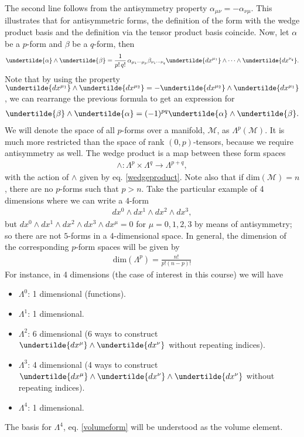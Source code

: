 \documentclass[10pt]{article}
\begin{document}
	The second line follows from the antisymmetry property $\alpha_{\mu\nu}=-\alpha_{\nu\mu}$. This illustrates that for antisymmetric forms, the definition of the form with the wedge product basis and the definition via the tensor product basis coincide. Now, let $\alpha$ be a $p$-form and $\beta$ be a $q$-form, then
	\begin{align}
	\label{wedgeproduct}
	\undertilde{\alpha}\wedge\undertilde{\beta}=\frac{1}{p!\, q!}\, \alpha_{\mu_1\cdots\mu_p}\beta_{\nu_1\cdots\nu_q}\undertilde{dx^{\mu_1}}\wedge \cdots \wedge \undertilde{dx^{\nu_q}}.
	\end{align}
	Note that by using the property $\undertilde{dx^{\mu_1}}\wedge \undertilde{dx^{\mu_2}}=-\undertilde{dx^{\mu_2}}\wedge \undertilde{dx^{\mu_1}}$, we can rearrange the previous formula to get an expression for 
	\begin{align}
	\undertilde{\beta}\wedge\undertilde{\alpha}=(-1)^{pq}\undertilde{\alpha}\wedge\undertilde{\beta}.
	\end{align}
	We will denote the space of all $p$-forms over a manifold, $\mathcal{M}$, as $\Lambda^p(\mathcal{M})$. It is much more restricted than the space of rank $(0,p)$-tensors, because we require antisymmetry as well. The wedge product is a map between these form spaces
	\begin{align}
	\wedge: \Lambda^p \times \Lambda^q \longrightarrow \Lambda^{p+q},
	\end{align} 
	with the action of $\wedge$ given by eq. \eqref{wedgeproduct}. Note also that if dim$(\mathcal{M})=n$, there are no $p$-forms such that $p>n$. Take the particular example of 4 dimensions where we can write a $4$-form
	\begin{align}
	\label{volumeform}
	dx^0\wedge dx^1 \wedge dx^2 \wedge dx^3,
	\end{align}
	but $dx^0\wedge dx^1 \wedge dx^2 \wedge dx^3\wedge dx^{\mu}=0$ for $\mu=0,1,2,3$ by means of antisymmetry; so there are not $5$-forms in a 4-dimensional space. In general, the dimension of the corresponding $p$-form spaces will be given by
	\begin{align}
	\text{dim}(\Lambda^p)=\frac{n!}{p!(n-p)!}
	\end{align}
	For instance, in 4 dimensions (the case of interest in this course) we will have
	\begin{itemize}
	\item $\Lambda^0$: 1 dimensional (functions).
	\item $\Lambda^1$: 1 dimensional. 
	\item $\Lambda^2$: 6 dimensional (6 ways to construct $\undertilde{dx^{\mu}}\wedge \undertilde{dx^{\nu}}$ without repeating indices).
	\item $\Lambda^3$: 4 dimensional (4 ways to construct $\undertilde{dx^{\mu}}\wedge \undertilde{dx^{\nu}}\wedge \undertilde{dx^{\nu}}$ without repeating indices).
	\item $\Lambda^4$: 1 dimensional.
	\end{itemize}
	The basis for $\Lambda^4$, eq. \eqref{volumeform} will be understood as the volume element.
\end{document}
